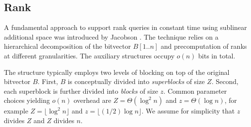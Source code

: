 




\subsection{\textsf{Rank}} \label{subsec:rank}

A fundamental approach to support \textsf{rank} queries in constant time using sublinear additional space was introduced by Jacobson \cite{Jacobson}. The technique relies on a hierarchical decomposition of the bitvector $B[1..n]$ and precomputation of ranks at different granularities. The auxiliary structures occupy $o(n)$ bits in total.

The structure typically employs two levels of blocking on top of the original bitvector $B$. First, $B$ is conceptually divided into \emph{superblocks} of size $Z$. Second, each superblock is further divided into \emph{blocks} of size $z$. Common parameter choices yielding $o(n)$ overhead are $Z = \Theta(\log^2 n)$ and $z = \Theta(\log n)$, for example $Z = \lfloor \log^2 n \rfloor$ and $z = \lfloor (1/2) \log n \rfloor$. We assume for simplicity that $z$ divides $Z$ and $Z$ divides $n$.

